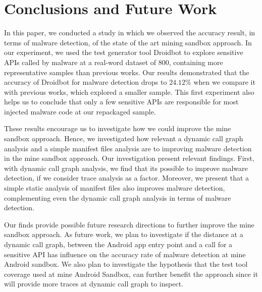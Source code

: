 \section{Conclusions and Future Work}\label{sec:conclusions}

In this paper, we conducted a study in which we observed the accuracy result, in terms of malware detection, of the state of the art mining sandbox approach. In our experiment, we used the test generator tool Droidbot to explore sensitive APIs called by malware at a real-word dataset of $800$, containing more representative samples than previous works. Our results demonstrated that the accuracy of Droidbot for malware detection drops to $24.12\%$ when we compare it with previous works, which explored a smaller sample. This first experiment also helps us to conclude that only a few sensitive APIs are responsible for most injected malware code at our repackaged sample.

These results encourage us to investigate how we could improve the mine sandbox approach. Hence, we investigated how relevant a dynamic call graph analysis and a simple manifest files analysis are to improving malware detection in the mine sandbox approach. Our investigation present relevant findings. First, with dynamic call graph analysis, we find that its possible to improve malware detection, if we consider trace analysis as a factor. Moreover, we present that a simple static analysis of manifest files also improves malware detection, complementing even the dynamic call graph analysis in terms of malware detection.

Our finds provide possible future research directions to further improve the mine sandbox approach. As future work, we plan to investigate if the distance at a dynamic call graph, between the Android app entry point and a call for a sensitive API has influence on the accuracy rate of malware detection at mine Android sandbox. We also plan to investigate the hypothesis that the test tool coverage used at mine Android Sandbox, can further benefit the approach since it will provide more traces at dynamic call graph to inspect.

